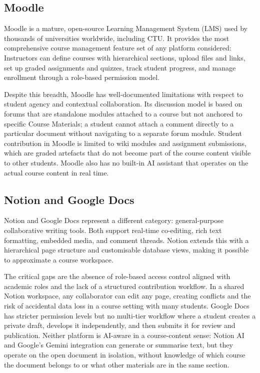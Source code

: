 \subsection{Moodle}
\label{subsec:moodle}

Moodle is a mature, open-source Learning Management System (LMS) used by thousands of
universities worldwide, including CTU. It provides the most comprehensive course management
feature set of any platform considered: Instructors can define courses with hierarchical sections,
upload files and links, set up graded assignments and quizzes, track student progress, and manage
enrollment through a role-based permission model.

Despite this breadth, Moodle has well-documented limitations with respect to student agency and
contextual collaboration. Its discussion model is based on forums that are standalone modules
attached to a course but not anchored to specific Course Materials; a student cannot attach a
comment directly to a particular document without navigating to a separate forum module. Student
contribution in Moodle is limited to wiki modules and assignment submissions, which are graded
artefacts that do not become part of the course content visible to other students. Moodle also
has no built-in AI assistant that operates on the actual course content in real time.

\subsection{Notion and Google Docs}
\label{subsec:notion-docs}

Notion and Google Docs represent a different category: general-purpose collaborative writing
tools. Both support real-time co-editing, rich text formatting, embedded media, and comment
threads. Notion extends this with a hierarchical page structure and customisable database views,
making it possible to approximate a course workspace.

The critical gaps are the absence of role-based access control aligned with academic roles and
the lack of a structured contribution workflow. In a shared Notion workspace, any collaborator
can edit any page, creating conflicts and the risk of accidental data loss in a course setting
with many students. Google Docs has stricter permission levels but no multi-tier workflow where a
student creates a private draft, develops it independently, and then submits it for review and
publication. Neither platform is AI-aware in a course-content sense: Notion AI and Google's
Gemini integration can generate or summarise text, but they operate on the open document in
isolation, without knowledge of which course the document belongs to or what other materials are
in the same section.


